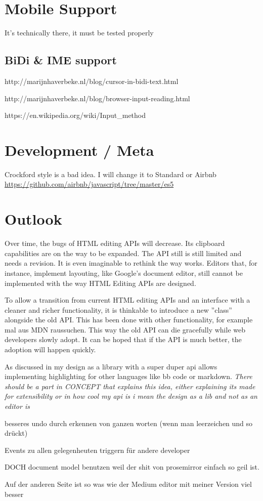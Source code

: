 

\section{Mobile Support}

It's technically there, it must be tested properly


\subsection{BiDi \& IME support}

http://marijnhaverbeke.nl/blog/cursor-in-bidi-text.html

http://marijnhaverbeke.nl/blog/browser-input-reading.html 

https://en.wikipedia.org/wiki/Input\_method


\section{Development / Meta}
Crockford style is a bad idea. 
I will change it to Standard or Airbnb 
\url{https://github.com/airbnb/javascript/tree/master/es5}


\section{Outlook}

Over time, the bugs of HTML editing APIs will decrease. Its clipboard capabilities are on the way to be expanded. The API still is still limited and needs a revision. It is even imaginable to rethink the way  works. Editors that, for instance, implement layouting, like Google's document editor, still cannot be implemented with the way HTML Editing APIs are designed.

To allow a transition from current HTML editing APIs and an interface with a cleaner and richer functionality, it is thinkable to introduce a new ''class'' alongside the old API. This has been done with other functionality, for example mal aus MDN raussuchen. This way the old API can die gracefully while web developers slowly adopt. It can be hoped that if the API is much better, the adoption will happen quickly.


As discussed in  my design as a library with a super duper api allows implementing highlighting for other languages like bb code or markdown. \textit{There should be a part in CONCEPT that explains this idea, either explaining its made for extensibility or in how cool my api is i mean the design as a lib and not as an editor is}


besseres undo durch erkennen von ganzen worten (wenn man leerzeichen und so drückt)

Events zu allen gelegenheuten triggern für andere developer


DOCH document model benutzen weil der shit von prosemirror einfach so geil ist.

Auf der anderen Seite ist so was wie der Medium editor mit meiner Version viel besser